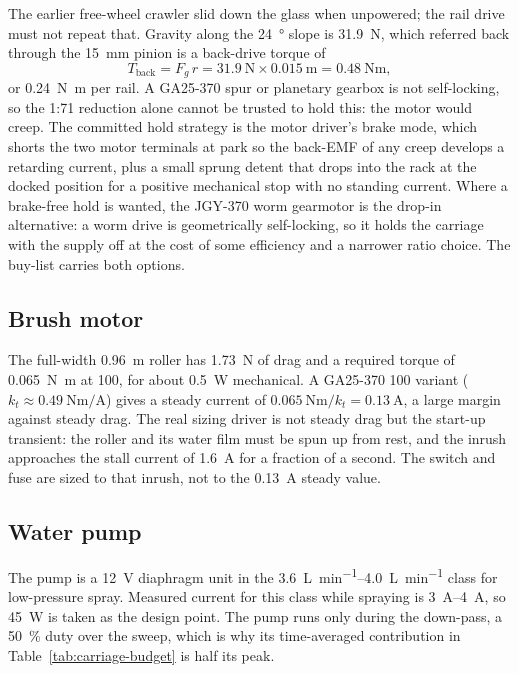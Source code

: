\documentclass[11pt,a4paper]{article}
\begin{document}
The earlier free-wheel crawler slid down the glass when unpowered; the rail drive
must not repeat that. Gravity along the \SI{24}{\degree} slope is
\SI{31.9}{\newton}, which referred back through the \SI{15}{\milli\meter} pinion
is a back-drive torque of
\begin{equation}
  T_{\text{back}} = F_{g}\,r = \SI{31.9}{\newton}\times\SI{0.015}{\meter}
  = \SI{0.48}{\newton\meter},
  \label{eq:tback}
\end{equation}
or \SI{0.24}{\newton\meter} per rail. A GA25-370 spur or planetary gearbox is not
self-locking, so the \num{1}:\num{71} reduction alone cannot be trusted to hold
this: the motor would creep. The committed hold strategy is the motor driver's
brake mode, which shorts the two motor terminals at park so the back-EMF of any
creep develops a retarding current, plus a small sprung detent that drops into the
rack at the docked position for a positive mechanical stop with no standing
current. Where a brake-free hold is wanted, the JGY-370 worm gearmotor is the
drop-in alternative: a worm drive is geometrically self-locking, so it holds the
carriage with the supply off at the cost of some efficiency and a narrower ratio
choice. The buy-list carries both options.

\subsection{Brush motor}

The full-width \SI{0.96}{\meter} roller has \SI{1.73}{\newton} of drag and a
required torque of \SI{0.065}{\newton\meter} at \SI{100}{\rpm}, for about
\SI{0.5}{\watt} mechanical. A GA25-370 \SI{100}{\rpm} variant
($k_t\approx\SI{0.49}{\newton\meter\per\ampere}$) gives a steady current of
$\SI{0.065}{\newton\meter}/k_t=\SI{0.13}{\ampere}$, a large margin against steady
drag. The real sizing driver is not steady drag but the start-up transient: the
roller and its water film must be spun up from rest, and the inrush approaches the
stall current of \SI{1.6}{\ampere} for a fraction of a second. The switch and fuse
are sized to that inrush, not to the \SI{0.13}{\ampere} steady value.

\subsection{Water pump}

The pump is a \SI{12}{\volt} diaphragm unit in the \SIrange{3.6}{4.0}{\liter\per\minute}
class for low-pressure spray. Measured current for this class while spraying is
\SIrange{3}{4}{\ampere}, so \SI{45}{\watt} is taken as the design point. The pump
runs only during the down-pass, a \SI{50}{\percent} duty over the sweep, which is
why its time-averaged contribution in Table~\ref{tab:carriage-budget} is half its
peak.
\end{document}
